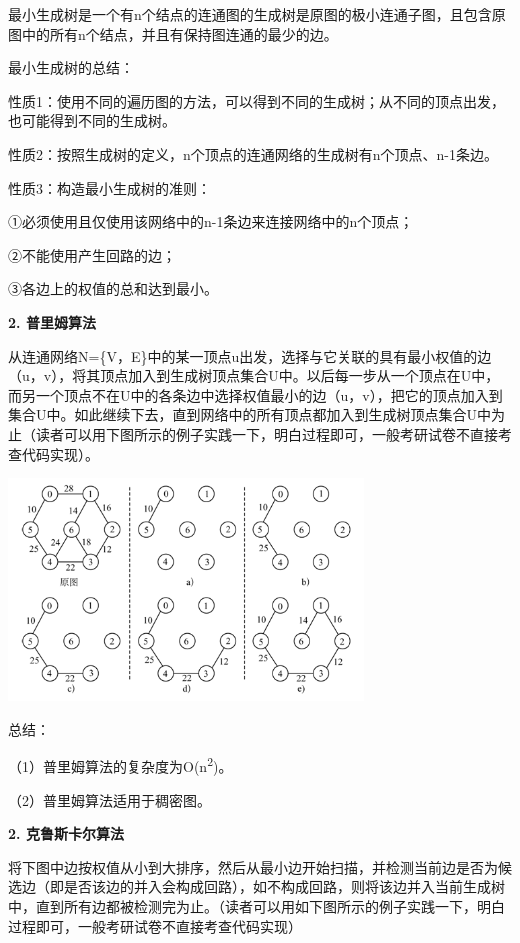 {最小生成树是{一个有n个结点的连通图的生成树是原图的极小连通子图，且包含原图中的所有n个结点，并且有保持图连通的最少的边。}}

{最小生成树的总结：}

{性质1：使用不同的遍历图的方法，可以得到不同的生成树；从不同的顶点出发，也可能得到不同的生成树。}

{性质2：按照生成树的定义，n个顶点的连通网络的生成树有n个顶点、n-1条边。}

{性质3：构造最小生成树的准则：}

{①必须使用且仅使用该网络中的n-1条边来连接网络中的n个顶点；}

{②不能使用产生回路的边；}

{③各边上的权值的总和达到最小。}

{\textbf{2. 普里姆算法}}

{从连通网络N=\{V，E\}中的某一顶点u出发，选择与它关联的具有最小权值的边（u，v），将其顶点加入到生成树顶点集合U中。以后每一步从一个顶点在U中，而另一个顶点不在U中的各条边中选择权值最小的边（u，v），把它的顶点加入到集合U中。如此继续下去，直到网络中的所有顶点都加入到生成树顶点集合U中为止（读者可以用下图所示的例子实践一下，明白过程即可，一般考研试卷不直接考查代码实现）。}

\includegraphics[width=3.70833in,height=2.32292in]{png-jpeg-pics/D43193B0360B43E38FBD1456AE03CDF3.png}

{总结：}

{（1）普里姆算法的复杂度为O(n\textsuperscript{2})。}

{（2）{普里姆算法适用于稠密图}。}


{\textbf{2. 克鲁斯卡尔算法}}

{将下图中边按权值从小到大排序，然后从最小边开始扫描，并检测当前边是否为候选边（即是否该边的并入会构成回路），如不构成回路，则将该边并入当前生成树中，直到所有边都被检测完为止。（读者可以用如下图所示的例子实践一下，明白过程即可，一般考研试卷不直接考查代码实现）}

